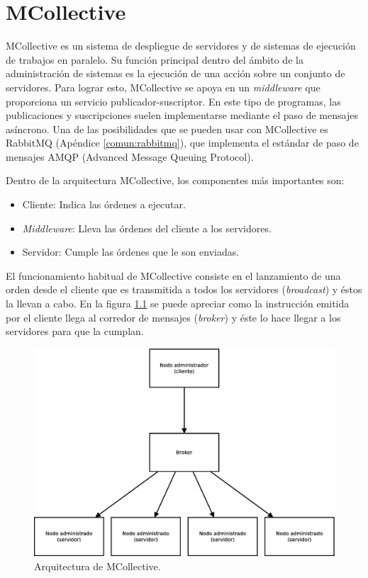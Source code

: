 \chapter{MCollective}
\label{comun:mcollective}


MCollective es un sistema de despliegue de servidores y de sistemas de ejecución de trabajos en paralelo. Su función principal dentro del ámbito de la administración de sistemas es la ejecución de una acción sobre un conjunto de servidores. Para lograr esto, MCollective se apoya en un \emph{middleware} que proporciona un servicio publicador-suscriptor. En este tipo de programas, las publicaciones y suscripciones suelen implementarse mediante el paso de mensajes asíncrono. Una de las posibilidades que se pueden usar con MCollective es RabbitMQ (Apéndice \ref{comun:rabbitmq}), que implementa el estándar de paso de mensajes AMQP (Advanced Message Queuing Protocol).

Dentro de la arquitectura MCollective, los componentes más importantes son:
\begin{itemize}
\item Cliente: Indica las órdenes a ejecutar.
\item \emph{Middleware}: Lleva las órdenes del cliente a los servidores.
\item Servidor: Cumple las órdenes que le son enviadas.
\end{itemize}

El funcionamiento habitual de MCollective consiste en el lanzamiento de una orden desde el cliente que es transmitida a todos los servidores (\emph{broadcast}) y éstos la llevan a cabo. En la figura \ref{figure:arquitectura-mcollective} se puede apreciar como la instrucción emitida por el cliente llega al corredor de mensajes (\emph{broker}) y éste lo hace llegar a los servidores para que la cumplan.

\begin{figure} [!htbp]
  \centering
  \includegraphics[width=13.5cm]{figuras/Arquitectura_MCollective.eps}
  \caption{Arquitectura de MCollective.}
\label{figure:arquitectura-mcollective}
\end{figure}

